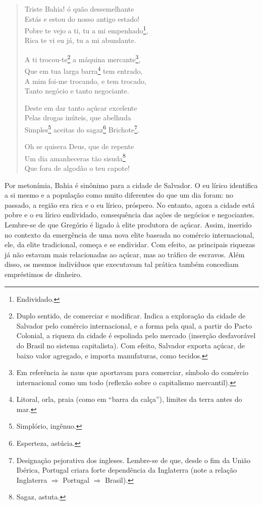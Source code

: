 \begin{verse}
Triste Bahia! ó quão dessemelhante \\
Estás e estou do nosso antigo estado! \\ 
Pobre te vejo a ti, tu a mi empenhado\footnote{Endividado.}, \\
Rica te vi eu já, tu a mi abundante.
				
A ti trocou-te\footnote{Duplo sentido, de comerciar e modificar. Indica a exploração da cidade de Salvador pelo comércio internacional, e a forma pela qual, a partir do Pacto Colonial, a riqueza da cidade é espoliada pelo mercado (inserção desfavorável do Brasil no sistema capitalista). Com efeito, Salvador exporta açúcar, de baixo valor agregado, e importa manufaturas, como tecidos.} a máquina mercante\footnote{Em referência às naus que aportavam para comerciar, símbolo do comércio internacional como um todo (reflexão sobre o capitalismo mercantil).}, \\
Que em tua larga barra\footnote{Litoral, orla, praia (como em ``barra da calça''), limites da terra antes do mar.} tem entrado, \\
A mim foi-me trocando, e tem trocado, \\
Tanto negócio e tanto negociante.
				
Deste em dar tanto açúcar excelente \\
Pelas drogas inúteis, que abelhuda \\
Simples\footnote{Simplório, ingênuo.} aceitas do sagaz\footnote{Esperteza, astúcia.} Brichote\footnote{Designação pejorativa dos ingleses. Lembre-se de que, desde o fim da União Ibérica, Portugal criara forte dependência da Inglaterra (note a relação Inglaterra $\Rightarrow$ Portugal $\Rightarrow$ Brasil).}.
				
Oh se quisera Deus, que de repente \\
Um dia amanheceras tão sisuda\footnote{Sagaz, astuta.} \\
Que fora de algodão o teu capote! \\
\end{verse}

Por metonímia, Bahia é sinônimo para a cidade de Salvador. O eu lírico identifica a si mesmo e a população como muito diferentes do que um dia foram: no passado, a região era rica e o eu lírico, próspero. No entanto, agora a cidade está pobre e o eu lírico endividado, consequência das ações de negócios e negociantes. Lembre-se de que Gregório é ligado à elite produtora de açúcar. Assim, inserido no contexto da emergência de uma nova elite baseada no comércio internacional, ele, da elite tradicional, começa e se endividar. Com efeito, as principais riquezas já não estavam mais relacionadas ao açúcar, mas ao tráfico de escravos. Além disso, os mesmos indivíduos que executavam tal prática também concediam empréstimos de dinheiro.

